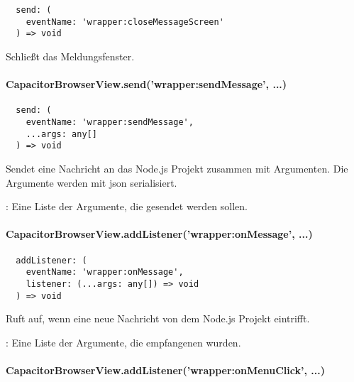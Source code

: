 \begin{verbatim}
  send: (
    eventName: 'wrapper:closeMessageScreen'
  ) => void
\end{verbatim}

Schließt das Meldungsfenster.


\paragraph{CapacitorBrowserView.send('wrapper:sendMessage', ...)}

\begin{verbatim}
  send: (
    eventName: 'wrapper:sendMessage',
    ...args: any[]
  ) => void
\end{verbatim}

Sendet eine Nachricht an das Node.js Projekt zusammen mit Argumenten.
Die Argumente werden mit \ac{json} serialisiert.

\begin{arguments}
  \item {}: Eine Liste der Argumente, die gesendet werden sollen.
\end{arguments}


\paragraph{CapacitorBrowserView.addListener('wrapper:onMessage', ...)}

\begin{verbatim}
  addListener: (
    eventName: 'wrapper:onMessage',
    listener: (...args: any[]) => void
  ) => void
\end{verbatim}

Ruft  auf, wenn eine neue Nachricht von dem Node.js Projekt eintrifft.

\begin{arguments}
  \item {}: Eine Liste der Argumente, die empfangenen wurden.
\end{arguments}


\paragraph{CapacitorBrowserView.addListener('wrapper:onMenuClick', ...)}

